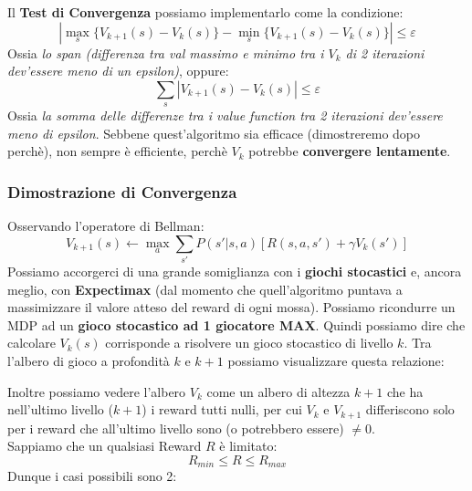 Il \textbf{Test di Convergenza} possiamo implementarlo come la condizione:
\begin{equation}
    |\max_s \{V_{k+1}(s) - V_k(s)\} - \min_s \{V_{k+1}(s) - V_k(s)\}| \leq \varepsilon
\end{equation}
Ossia \textit{lo span (differenza tra val massimo e minimo tra i $V_k$ di 2 iterazioni dev'essere meno di un epsilon)}, oppure:
\begin{equation}
    \sum_{s} |V_{k+1} (s) - V_k(s)| \leq \varepsilon
\end{equation} 
Ossia \textit{la somma delle differenze tra i value function tra 2 iterazioni dev'essere meno di epsilon}.
Sebbene quest'algoritmo sia efficace (dimostreremo dopo perchè), non sempre è efficiente, perchè $V_k$ potrebbe \textbf{convergere lentamente}.


\subsubsection{Dimostrazione di Convergenza}
Osservando l'operatore di Bellman:
\begin{equation}
    V_{k+1}(s) \leftarrow \max_{a} \sum_{s'} P(s'|s,a)[R(s,a,s') + \gamma V_k(s')]
\end{equation}
Possiamo accorgerci di una grande somiglianza con i \textbf{giochi stocastici} e, ancora meglio, con \textbf{Expectimax} (dal momento
che quell'algoritmo puntava a massimizzare il valore atteso del reward di ogni mossa). Possiamo ricondurre un MDP ad un \textbf{gioco
stocastico ad 1 giocatore MAX}. Quindi possiamo dire che calcolare $V_k(s)$ corrisponde a risolvere un gioco stocastico di livello $k$.
Tra l'albero di gioco a profondità $k$ e $k + 1$ possiamo visualizzare questa relazione:
\begin{center}
\end{center}
Inoltre possiamo vedere l'albero $V_k$ come un albero di altezza $k + 1$ che ha nell'ultimo livello ($k+1$) i reward tutti nulli,
per cui $V_k$ e $V_{k+1}$ differiscono solo per i reward che all'ultimo livello sono (o potrebbero essere) $\neq 0$.\\
Sappiamo che un qualsiasi Reward $R$ è limitato:
\begin{equation*}
    R_{min} \leq R \leq R_{max}
\end{equation*}
Dunque i casi possibili sono 2:
